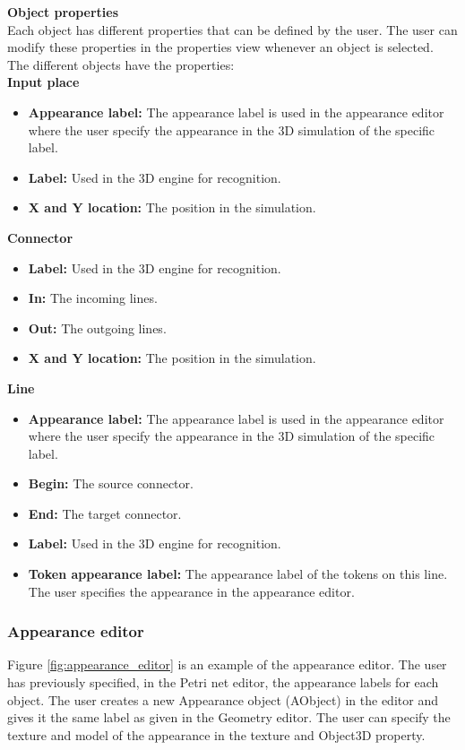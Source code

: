 \textbf{Object properties} \\
Each object has different properties that can be defined by the user. The user can modify these properties in the properties view whenever an object is selected. The different objects have the properties: \\
\textbf{Input place}
\begin{itemize}
\item{\textbf{Appearance label:} The appearance label is used in the appearance editor where the user specify the appearance in the 3D simulation of the specific label.}
\item{\textbf{Label:} Used in the 3D engine for recognition.}
\item{\textbf{X and Y location:} The position in the simulation.}
\end{itemize}
\textbf{Connector}
\begin{itemize}
\item{\textbf{Label:} Used in the 3D engine for recognition.}
\item{\textbf{In:} The incoming lines.}
\item{\textbf{Out:} The outgoing lines.}
\item{\textbf{X and Y location:} The position in the simulation.}
\end{itemize}
\textbf{Line}
\begin{itemize}
\item{\textbf{Appearance label:} The appearance label is used in the appearance editor where the user specify the appearance in the 3D simulation of the specific label.}
\item{\textbf{Begin:} The source connector.}
\item{\textbf{End:} The target connector.}
\item{\textbf{Label:} Used in the 3D engine for recognition.}
\item{\textbf{Token appearance label:} The appearance label of the tokens on this line. The user specifies the appearance in the appearance editor.}
\end{itemize}

\subsubsection{Appearance editor}
Figure \ref{fig:appearance_editor} is an example of the appearance editor. The user has previously specified, in the Petri net editor, the appearance labels for each object. The user creates a new Appearance object (AObject) in the editor and gives it the same label as given in the Geometry editor. The user can specify the texture and model of the appearance in the texture and Object3D property.

